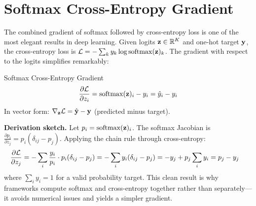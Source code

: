 \section{Softmax Cross-Entropy Gradient}
\label{sec:softmax_ce_gradient}

The combined gradient of softmax followed by cross-entropy loss is one of the most elegant results in deep learning. Given logits $\mathbf{z} \in \mathbb{R}^K$ and one-hot target $\mathbf{y}$, the cross-entropy loss is $\mathcal{L} = -\sum_k y_k \log \operatorname{softmax}(\mathbf{z})_k$. The gradient with respect to the logits simplifies remarkably:

\begin{mathresult}{Softmax Cross-Entropy Gradient}
\begin{equation}
\frac{\partial \mathcal{L}}{\partial z_i} = \operatorname{softmax}(\mathbf{z})_i - y_i = \hat{y}_i - y_i
\end{equation}
In vector form: $\nabla_{\mathbf{z}} \mathcal{L} = \hat{\mathbf{y}} - \mathbf{y}$ (predicted minus target).
\end{mathresult}

\textbf{Derivation sketch.} Let $p_i = \operatorname{softmax}(\mathbf{z})_i$. The softmax Jacobian is $\frac{\partial p_i}{\partial z_j} = p_i(\delta_{ij} - p_j)$. Applying the chain rule through cross-entropy:
\begin{align}
\frac{\partial \mathcal{L}}{\partial z_j} &= -\sum_i \frac{y_i}{p_i} \cdot p_i(\delta_{ij} - p_j) = -\sum_i y_i(\delta_{ij} - p_j) = -y_j + p_j \sum_i y_i = p_j - y_j
\end{align}
where $\sum_i y_i = 1$ for a valid probability target. This clean result is why frameworks compute softmax and cross-entropy together rather than separately---it avoids numerical issues and yields a simpler gradient.

